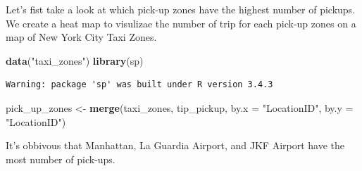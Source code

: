\documentclass[12pt,twoside]{reedthesis}
\newenvironment{Shaded}{\begin{snugshade}}{\end{snugshade}}
\newcommand{\KeywordTok}[1]{\textcolor[rgb]{0.13,0.29,0.53}{\textbf{#1}}}
\newcommand{\DataTypeTok}[1]{\textcolor[rgb]{0.13,0.29,0.53}{#1}}
\newcommand{\StringTok}[1]{\textcolor[rgb]{0.31,0.60,0.02}{#1}}
\newcommand{\CommentTok}[1]{\textcolor[rgb]{0.56,0.35,0.01}{\textit{#1}}}
\newcommand{\OtherTok}[1]{\textcolor[rgb]{0.56,0.35,0.01}{#1}}
\newcommand{\NormalTok}[1]{#1}
\theoremstyle{definition}
\theoremstyle{definition}
\theoremstyle{definition}
\theoremstyle{remark}
\begin{document}
Let's fist take a look at which pick-up zones have the highest number of
pickups. We create a heat map to visulizae the number of trip for each
pick-up zones on a map of New York City Taxi Zones.
\begin{Shaded}
\begin{Highlighting}[]
\KeywordTok{data}\NormalTok{(}\StringTok{"taxi_zones"}\NormalTok{)}
\KeywordTok{library}\NormalTok{(sp)}
\end{Highlighting}
\end{Shaded}
\begin{verbatim}
Warning: package 'sp' was built under R version 3.4.3
\end{verbatim}
\begin{Shaded}
\begin{Highlighting}[]
\NormalTok{pick_up_zones <-}\StringTok{ }\KeywordTok{merge}\NormalTok{(taxi_zones, tip_pickup, }\DataTypeTok{by.x =} \StringTok{"LocationID"}\NormalTok{, }
    \DataTypeTok{by.y =} \StringTok{"LocationID"}\NormalTok{)}
\end{Highlighting}
\end{Shaded}
\begin{Shaded}
\end{Shaded}
It's obbivous that Manhattan, La Guardia Airport, and JKF Airport have
the most number of pick-ups.
\end{document}
